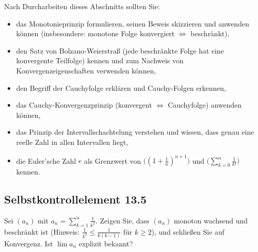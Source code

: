 \documentclass[a4paper,12pt]{article}
\begin{document}
Nach Durcharbeiten dieses Abschnitts sollten Sie:
\begin{itemize}
  \item das Monotonieprinzip formulieren, seinen Beweis skizzieren und anwenden können
        (insbesondere: monotone Folge konvergiert $\Leftrightarrow$ beschränkt),
  \item den Satz von Bolzano-Weierstraß (jede beschränkte Folge hat eine konvergente Teilfolge)
        kennen und zum Nachweis von Konvergenzeigenschaften verwenden können,
  \item den Begriff der Cauchyfolge erklären und Cauchy-Folgen erkennen,
  \item das Cauchy-Konvergenzprinzip (konvergent $\Leftrightarrow$ Cauchyfolge) anwenden können,
  \item das Prinzip der Intervallschachtelung verstehen und wissen, dass genau eine reelle Zahl
        in allen Intervallen liegt,
  \item die Euler'sche Zahl $e$ als Grenzwert von $\bigl((1+\tfrac{1}{n})^{n+1}\bigr)$
        und $\bigl(\sum_{k=0}^{n}\tfrac{1}{k!}\bigr)$ kennen.
\end{itemize}

\subsection*{Selbstkontrollelement 13.5}

Sei $(a_n)$ mit $a_n = \sum_{k=1}^{n}\tfrac{1}{k^2}$. Zeigen Sie, dass $(a_n)$ monoton wachsend
und beschränkt ist (Hinweis: $\tfrac{1}{k^2} \leq \tfrac{1}{k(k-1)}$ für $k \geq 2$), und
schließen Sie auf Konvergenz. Ist $\lim a_n$ explizit bekannt?
\end{document}
